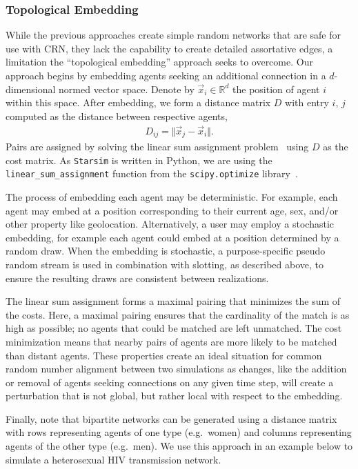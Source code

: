 \documentclass[10pt,letterpaper]{article}
\newcommand{\starsim}{\texttt{Starsim} }
\begin{document}
\subsubsection*{Topological Embedding}

While the previous approaches create simple random networks that are safe for use with CRN, they lack the capability to create detailed assortative edges, a limitation the ``topological embedding'' approach seeks to overcome.  Our approach begins by embedding agents seeking an additional connection in a $d$-dimensional normed vector space. Denote by $\vec{x}_i \in \mathbb{R}^d$ the position of agent $i$ within this space. After embedding, we form a distance matrix $D$ with entry $i$, $j$ computed as the distance between respective agents,
\begin{align}
    D_{ij} = \Vert \vec{x}_j - \vec{x}_i \Vert.
\end{align}
Pairs are assigned by solving the linear sum assignment problem~\cite{crouse2016implementing} using $D$ as the cost matrix. As \starsim is written in Python, we are using the \texttt{linear\_sum\_assignment} function from the \texttt{scipy.optimize} library~\cite{2020SciPy-NMeth}.

The process of embedding each agent may be deterministic. For example, each agent may embed at a position corresponding to their current age, sex, and/or other property like geolocation. Alternatively, a user may employ a stochastic embedding, for example each agent could embed at a position determined by a random draw. When the embedding is stochastic, a purpose-specific pseudo random stream is used in combination with slotting, as described above, to ensure the resulting draws are consistent between realizations.

The linear sum assignment forms a maximal pairing that minimizes the sum of the costs. Here, a maximal pairing ensures that the cardinality of the match is as high as possible; no agents that could be matched are left unmatched. The cost minimization means that nearby pairs of agents are more likely to be matched than distant agents. These properties create an ideal situation for common random number alignment between two simulations as changes, like the addition or removal of agents seeking connections on any given time step, will create a perturbation that is not global, but rather local with respect to the embedding.

Finally, note that bipartite networks can be generated using a distance matrix with rows representing agents of one type (e.g.~women) and columns representing agents of the other type (e.g.~men). We use this approach in an example below to simulate a heterosexual HIV transmission network.
\end{document}
